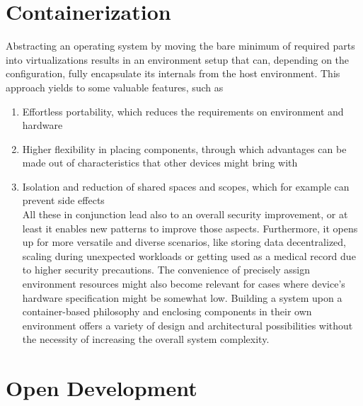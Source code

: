 \documentclass[12pt,english,a4paper,titlepage,cleardoublepage=empty,dottedtoc]{report}
\providecommand{\tightlist}{%
  \setlength{\itemsep}{0pt}\setlength{\parskip}{0pt}}
\begin{document}
\section{Containerization}\label{containerization}

Abstracting an operating system by moving the bare minimum of required
parts into virtualizations results in an environment setup that can,
depending on the configuration, fully encapsulate its internals from the
host environment. This approach yields to some valuable features, such
as

\begin{enumerate}
\def\labelenumi{(\Alph{enumi})}
\tightlist
\item
  Effortless portability, which reduces the requirements on environment
  and hardware
\item
  Higher flexibility in placing components, through which advantages can
  be made out of characteristics that other devices might bring with
\item
  Isolation and reduction of shared spaces and scopes, which for example
  can prevent side effects\\
  All these in conjunction lead also to an overall security improvement,
  or at least it enables new patterns to improve those aspects.
  Furthermore, it opens up for more versatile and diverse scenarios,
  like storing data decentralized, scaling during unexpected workloads
  or getting used as a medical record due to higher security
  precautions. The convenience of precisely assign environment resources
  might also become relevant for cases where device's hardware
  specification might be somewhat low. Building a system upon a
  container-based philosophy and enclosing components in their own
  environment offers a variety of design and architectural possibilities
  without the necessity of increasing the overall system complexity.
\end{enumerate}

\section{Open Development}\label{open-development}
\end{document}

